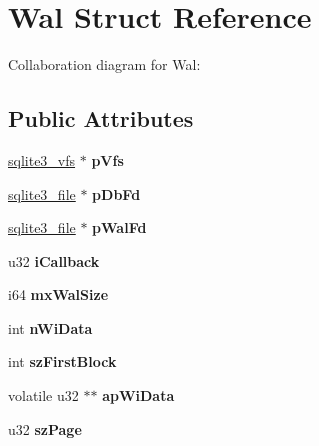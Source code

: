 \hypertarget{structWal}{}\section{Wal Struct Reference}
\label{structWal}


Collaboration diagram for Wal\+:
\subsection*{Public Attributes}
\begin{DoxyCompactItemize}
\item 
\hyperlink{structsqlite3__vfs}{sqlite3\+\_\+vfs} $\ast$ {\bfseries p\+Vfs}\hypertarget{structWal_a5431b060acbc998a7e3710587abaa11e}{}\label{structWal_a5431b060acbc998a7e3710587abaa11e}

\item 
\hyperlink{structsqlite3__file}{sqlite3\+\_\+file} $\ast$ {\bfseries p\+Db\+Fd}\hypertarget{structWal_a3a4d051c55228e554b36691c5095ed14}{}\label{structWal_a3a4d051c55228e554b36691c5095ed14}

\item 
\hyperlink{structsqlite3__file}{sqlite3\+\_\+file} $\ast$ {\bfseries p\+Wal\+Fd}\hypertarget{structWal_aea2a72ead42cfe57e3a6809e80884397}{}\label{structWal_aea2a72ead42cfe57e3a6809e80884397}

\item 
u32 {\bfseries i\+Callback}\hypertarget{structWal_aae230a2317817739a5f08ebb28b644b0}{}\label{structWal_aae230a2317817739a5f08ebb28b644b0}

\item 
i64 {\bfseries mx\+Wal\+Size}\hypertarget{structWal_a413f9f82c15d31627a2ed6eac9b6cc27}{}\label{structWal_a413f9f82c15d31627a2ed6eac9b6cc27}

\item 
int {\bfseries n\+Wi\+Data}\hypertarget{structWal_ae3e69420adab92acd90dd7c03d37815f}{}\label{structWal_ae3e69420adab92acd90dd7c03d37815f}

\item 
int {\bfseries sz\+First\+Block}\hypertarget{structWal_a901c02626270f4d51db89786e4994da9}{}\label{structWal_a901c02626270f4d51db89786e4994da9}

\item 
volatile u32 $\ast$$\ast$ {\bfseries ap\+Wi\+Data}\hypertarget{structWal_a2b0078e3adfd1fb21794561bb12bbfac}{}\label{structWal_a2b0078e3adfd1fb21794561bb12bbfac}

\item 
u32 {\bfseries sz\+Page}\hypertarget{structWal_a771c3a8c81326babc7d623255a6034c5}{}\label{structWal_a771c3a8c81326babc7d623255a6034c5}


\end{DoxyCompactItemize}
